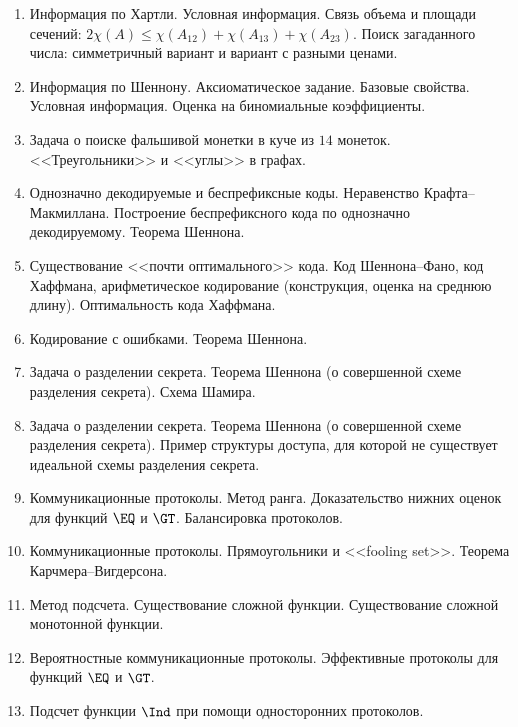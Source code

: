 

\newcommand{\norm}[1]{\left\lVert#1\right\rVert}




\begin{enumerate}
    \item Информация по Хартли. Условная информация. Связь объема и площади сечений: $2 \chi(A) \le
        \chi(A_{12}) + \chi(A_{13}) + \chi(A_{23})$. Поиск загаданного числа: симметричный вариант и
        вариант с разными ценами.
    \item Информация по Шеннону. Аксиоматическое задание. Базовые свойства. Условная информация.
        Оценка на биномиальные коэффициенты.
    \item Задача о поиске фальшивой монетки в куче из $14$ монеток. <<Треугольники>> и <<углы>> в
        графах.
    \item Однозначно декодируемые и беспрефиксные коды. Неравенство Крафта--Макмиллана.
        Построение беспрефиксного кода по однозначно декодируемому. Теорема Шеннона.
    \item Существование <<почти оптимального>> кода. Код Шеннона--Фано, код Хаффмана, арифметическое
        кодирование (конструкция, оценка на среднюю длину). Оптимальность кода Хаффмана.
    \item Кодирование с ошибками. Теорема Шеннона.
    \item Задача о разделении секрета. Теорема Шеннона (о совершенной схеме разделения секрета). Схема Шамира.
    \item Задача о разделении секрета. Теорема Шеннона (о совершенной схеме разделения секрета). Пример
        структуры доступа, для которой не существует идеальной схемы разделения секрета.
    \item Коммуникационные протоколы. Метод ранга. Доказательство нижних оценок для функций $\EQ$ и
        $\GT$. Балансировка протоколов.
    \item Коммуникационные протоколы. Прямоугольники и <<fooling set>>. Теорема Карчмера--Вигдерсона.
    \item Метод подсчета. Существование сложной функции. Существование сложной монотонной функции.
    \item Вероятностные коммуникационные протоколы. Эффективные протоколы для функций $\EQ$ и
        $\GT$.
    \item Подсчет функции $\Ind$ при помощи односторонних протоколов.

\end{enumerate}
